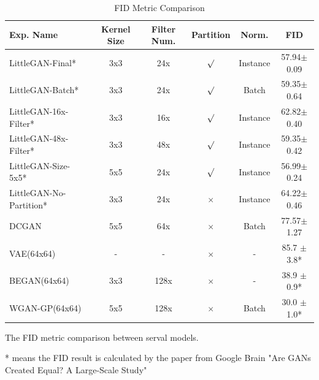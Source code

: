 \begin{table}
    \centering
    \caption{FID Metric Comparison}
    \label{result_fid}
    \begin{threeparttable}
    \begin{tabular}{l|ccccc}
        \hline
        Exp. Name    & Kernel Size & Filter Num.   & Partition          & Norm.         & FID            \\ \hline
        LittleGAN-Final*        & 3x3         & 24x           & $\surd$            & Instance      & 57.94$\pm$0.09 \\
        LittleGAN-Batch*        & 3x3         & 24x           & $\surd$            & Batch         & 59.35$\pm$0.64 \\
        LittleGAN-16x-Filter*   & 3x3         & 16x           & $\surd$            & Instance      & 62.82$\pm$0.40 \\
        LittleGAN-48x-Filter*   & 3x3         & 48x           & $\surd$            & Instance      & 59.35$\pm$0.42 \\
        LittleGAN-Size-5x5*     & 5x5         & 24x           & $\surd$            & Instance      & 56.99$\pm$0.24 \\
        LittleGAN-No-Partition* & 3x3         & 24x           & $\times$           & Instance      & 64.22$\pm$0.46 \\ \hline
        DCGAN        & 5x5         & 64x           & $\times$           & Batch         & 77.57$\pm$1.27 \\ \hline
        VAE(64x64)   & -           & -             & $\times$           & -             & 85.7 $\pm$3.8*  \\
        BEGAN(64x64) & 3x3         & 128x          & $\times$           & -             & 38.9 $\pm$0.9*  \\
        WGAN-GP(64x64) & 5x5       & 128x          & $\times$           & Batch         & 30.0 $\pm$1.0*  \\ \hline
    \end{tabular}
    \begin{tablenotes}
        \item The FID metric comparison between serval models.
        \item[*] means the FID result is calculated by the paper from Google Brain "Are GANs Created Equal? A Large-Scale Study"
    \end{tablenotes}
\end{threeparttable}
\end{table}

